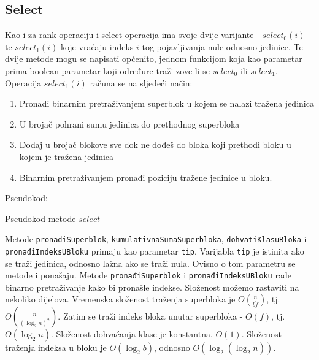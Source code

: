 \documentclass[times, utf8, seminar, numeric]{fer}
\begin{document}
\subsection{Select}
\label{subsec:select}
Kao i za rank operaciju i select operacija ima svoje dvije varijante - $select_0(i)$ te $select_1(i)$ koje vraćaju indeks $i$-tog pojavljivanja nule odnosno jedinice. Te dvije metode mogu se napisati općenito, jednom funkcijom koja kao parametar prima boolean parametar koji određure traži zove li se $select_0$ ili $select_1$.
Operacija $select_1(i)$ računa se na sljedeći način:
\begin{enumerate}
	\item Pronađi binarnim pretraživanjem superblok u kojem se nalazi tražena jedinica
	\item U brojač pohrani sumu jedinica do prethodnog superbloka
	\item Dodaj u brojač blokove sve dok ne dođeš do bloka koji prethodi bloku u kojem je tražena jedinica
	\item Binarnim pretraživanjem pronađi poziciju tražene jedinice u bloku.
\end{enumerate}
Pseudokod:

\begin{algorithm}[H]
 \caption{Pseudokod metode $select$}
\end{algorithm}

Metode \texttt{pronađiSuperblok}, \texttt{kumulativnaSumaSuperbloka}, \texttt{dohvatiKlasuBloka} i \texttt{pronađiIndeksUBloku} primaju kao parametar \texttt{tip}. Varijabla \texttt{tip} je istinita ako se traži jedinica, odnosno lažna ako se traži nula. Ovisno o tom parametru se metode i ponašaju. Metode \texttt{pronađiSuperblok} i \texttt{pronađiIndeksUBloku} rade binarno pretraživanje kako bi pronašle indekse.
Složenost možemo rastaviti na nekoliko dijelova. Vremenska složenost traženja superbloka je $O(\frac{n}{b \dot f})$, tj. $O(\frac{n}{(\log_2n)^2})$. Zatim se traži indeks bloka unutar superbloka - $O(f)$, tj. $O(\log_2n)$. Složenost dohvaćanja klase je konstantna, $O(1)$. Složenost traženja indeksa u bloku je $O(\log_2b)$, odnosno $O(\log_2(\log_2n))$.
\end{document}

